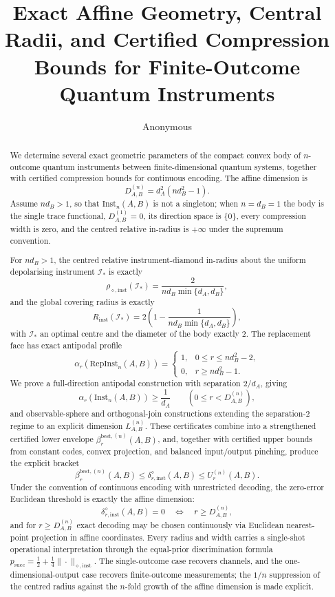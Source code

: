 \documentclass[11pt,a4paper]{article}
\title{\bfseries Exact Affine Geometry, Central Radii, and Certified Compression Bounds for Finite-Outcome Quantum Instruments}
\author{Anonymous}
\date{}
\newcommand{\Inst}{\mathrm{Inst}}
\newcommand{\RepInst}{\mathrm{RepInst}}
\begin{document}
\maketitle

\begin{abstract}
We determine several exact geometric parameters of the compact convex body of $n$-outcome quantum instruments between finite-dimensional quantum systems, together with certified compression bounds for continuous encoding. The affine dimension is
\[
D_{A,B}^{(n)}=d_A^2(nd_B^2-1).
\]
Assume $n d_B>1$, so that $\Inst_n(A,B)$ is not a singleton; when $n=d_B=1$ the body is the single trace functional, $D_{A,B}^{(1)}=0$, its direction space is $\{0\}$, every compression width is zero, and the centred relative in-radius is $+\infty$ under the supremum convention.

For $n d_B>1$, the centred relative instrument-diamond in-radius about the uniform depolarising instrument $\mathcal I_*$ is exactly
\[
\rho_{\diamond,\mathrm{inst}}(\mathcal I_*)
=\frac{2}{n d_B\min\{d_A,d_B\}},
\]
and the global covering radius is exactly
\[
R_{\mathrm{inst}}(\mathcal I_*)
=2\left(1-\frac{1}{n d_B\min\{d_A,d_B\}}\right),
\]
with $\mathcal I_*$ an optimal centre and the diameter of the body exactly $2$. The replacement face has exact antipodal profile
\[
\alpha_r(\RepInst_n(A,B))=
\begin{cases}
1,&0\le r\le n d_B^2-2,\\
0,&r\ge n d_B^2-1.
\end{cases}
\]
We prove a full-direction antipodal construction with separation $2/d_A$, giving
\[
\alpha_r(\Inst_n(A,B))\ge \frac1{d_A}
\qquad(0\le r<D_{A,B}^{(n)}),
\]
and observable-sphere and orthogonal-join constructions extending the separation-$2$ regime to an explicit dimension $L_{A,B}^{(n)}$. These certificates combine into a strengthened certified lower envelope $\beta_r^{\mathrm{best},(n)}(A,B)$, and, together with certified upper bounds from constant codes, convex projection, and balanced input/output pinching, produce the explicit bracket
\[
\beta_r^{\mathrm{best},(n)}(A,B)
\le
\delta_{r,\mathrm{inst}}^{\diamond}(A,B)
\le
U_r^{(n)}(A,B).
\]
Under the convention of continuous encoding with unrestricted decoding, the zero-error Euclidean threshold is exactly the affine dimension:
\[
\delta_{r,\mathrm{inst}}^{\diamond}(A,B)=0
\quad\Longleftrightarrow\quad
r\ge D_{A,B}^{(n)},
\]
and for $r\ge D_{A,B}^{(n)}$ exact decoding may be chosen continuously via Euclidean nearest-point projection in affine coordinates. Every radius and width carries a single-shot operational interpretation through the equal-prior discrimination formula $p_{\mathrm{succ}}=\tfrac12+\tfrac14\|\cdot\|_{\diamond,\mathrm{inst}}$. The single-outcome case recovers channels, and the one-dimensional-output case recovers finite-outcome measurements; the $1/n$ suppression of the centred radius against the $n$-fold growth of the affine dimension is made explicit.
\end{abstract}
\end{document}

